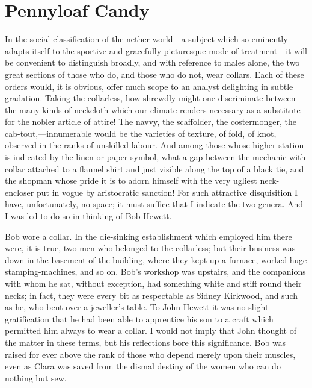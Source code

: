 \chapter{Pennyloaf Candy}

In the social classification of the nether world---a subject which so
eminently adapts itself to the sportive and gracefully picturesque mode
of treatment---it will be convenient to distinguish broadly, and with
reference to males alone, the two great sections of those who do, and
those who do not, wear collars. Each of these orders would, it is
obvious, offer much scope to an analyst delighting in subtle gradation.
Taking the collarless, how shrewdly might one discriminate between the
many kinds of neckcloth which our climate renders necessary as a
substitute for the nobler article of attire! The navvy, the scaffolder,
the costermonger, the cab-tout,---innumerable would be the varieties of
texture, of fold, of knot, observed in the ranks of
{\protect\hypertarget{167}{}{}}unskilled labour. And among those whose
higher station is indicated by the linen or paper symbol, what a gap
between the mechanic with collar attached to a flannel shirt and just
visible along the top of a black tie, and the shopman whose pride it is
to adorn himself with the very ugliest neck-encloser put in vogue by
aristocratic sanction! For such attractive disquisition I have,
unfortunately, no space; it must suffice that I indicate the two genera.
And I was led to do so in thinking of Bob Hewett.

Bob wore a collar. In the die-sinking establishment which employed him
there were, it is true, two men who belonged to the collarless; but
their business was down in the basement of the building, where they kept
up a furnace, worked huge stamping-machines, and so on. Bob's workshop
was upstairs, and the companions with whom he sat, without exception,
had something white and stiff round their necks; in fact, they were
every bit as respectable as Sidney Kirkwood, and such as he, who bent
over a {\protect\hypertarget{168}{}{}}jeweller's table. To John Hewett
it was no slight gratification that he had been able to apprentice his
son to a craft which permitted him always to wear a collar. I would not
imply that John thought of the matter in these terms, but his
reflections bore this significance. Bob was raised for ever above the
rank of those who depend merely upon their muscles, even as Clara was
saved from the dismal destiny of the women who can do nothing but sew.

